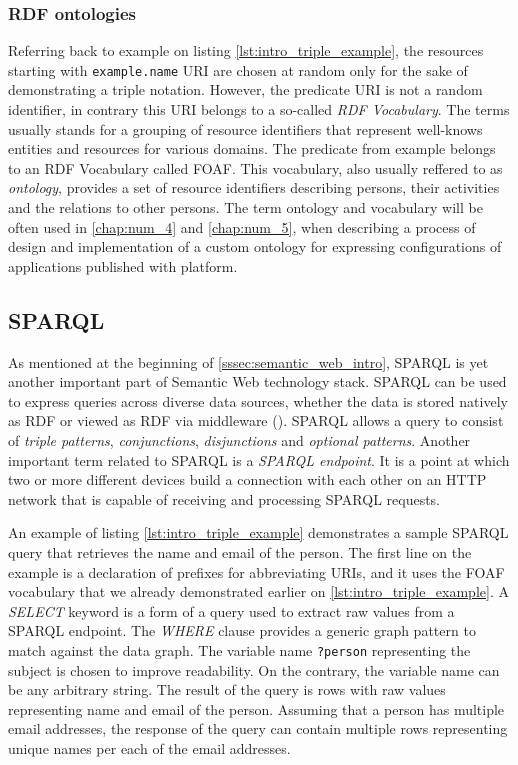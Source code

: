 \subsubsection{RDF ontologies}

Referring back to example on listing \autoref{lst:intro_triple_example}, the resources starting with \texttt{example.name} URI are chosen at random only for the sake of demonstrating a triple notation. However, the predicate URI is not a random identifier, in contrary this URI belongs to a so-called \textit{RDF Vocabulary}. The terms usually stands for a grouping of resource identifiers that represent well-knows entities and resources for various domains. The predicate from example belongs to an RDF Vocabulary called \gls{FOAF}. This vocabulary, also usually reffered to as \textit{ontology}, provides a set of resource identifiers describing persons, their activities and the relations to other persons. The term ontology and vocabulary will be often used in \autoref{chap:num_4} and \autoref{chap:num_5}, when describing a process of design and implementation of a custom ontology for expressing configurations of applications published with \lpa{} platform.

\subsection{SPARQL}

As mentioned at the beginning of \autoref{sssec:semantic_web_intro}, SPARQL is yet another important part of Semantic Web technology stack. SPARQL can be used to express queries across diverse data sources, whether the data is stored natively as RDF or viewed as RDF via middleware (\cite{Seaborne:08:SQL}). SPARQL allows a query to consist of \textit{triple patterns}, \textit{conjunctions}, \textit{disjunctions} and \textit{optional patterns}. Another important term related to SPARQL is a \textit{SPARQL endpoint}. It is a point at which two or more different devices build a connection with each other on an HTTP network that is capable of receiving and processing SPARQL requests.

An example of listing \autoref{lst:intro_triple_example} demonstrates a sample SPARQL query that retrieves the name and email of the person. The first line on the example is a declaration of prefixes for abbreviating URIs, and it uses the FOAF vocabulary that we already demonstrated earlier on \autoref{lst:intro_triple_example}. A \textit{SELECT} keyword is a form of a query used to extract raw values from a SPARQL endpoint. The \textit{WHERE} clause provides a generic graph pattern to match against the data graph. The variable name \texttt{?person} representing the subject is chosen to improve readability. On the contrary, the variable name can be any arbitrary string. The result of the query is rows with raw values representing name and email of the person. Assuming that a person has multiple email addresses, the response of the query can contain multiple rows representing unique names per each of the email addresses. 

